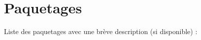 \section{\-Paquetages}
\-Liste des paquetages avec une brève description (si disponible) \-:\begin{DoxyCompactList}
\item{}
\item{}
\end{DoxyCompactList}
